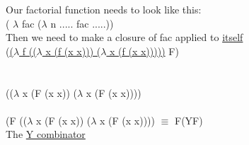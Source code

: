 \documentclass{article}
\newcommand\tab[1][1cm]{\hspace*{#1}}
\begin{document}
\begin{flushleft}
\begin{flushleft}
\begin{flushleft}
\vspace*{1cm}
Our factorial function needs to look like this: \\
( $\lambda$ fac ($\lambda$ n ..... fac .....))\\
\vspace*{1cm}
Then we need to make a closure of fac applied to \underline{itself}\\
\vspace*{0.4cm}
(\underline{($\lambda$ f (($\lambda$ x (f (x x))) ($\lambda$ x (f (x x)))))} F)\\
\textcolor{red}{\tab{y}}\\
\bigskip
{\LARGE \tab{$\downarrow$ $\beta$}}\\
\bigskip
(($\lambda$ x (F (x x)) ($\lambda$ x (F (x x))))\\
\bigskip
{\LARGE \tab{$\downarrow$ $\beta$}}\\
\bigskip
(F (($\lambda$ x (F (x x)) ($\lambda$ x (F (x x)))) $\equiv$ F(YF)\\
\vspace*{1.5cm}
The \underline{Y combinator}  

\end{flushleft}
\end{flushleft}
\end{flushleft}
\end{document}
